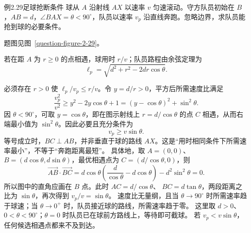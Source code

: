 \begin{origexamplebox}{例2.29\quad 足球抢断条件}
球从 $A$ 沿射线 $AX$ 以速率 $v$ 匀速滚动。守方队员初始在 $B$，$AB=d$，$\angle BAX=\theta<90^\circ$，队员以速率 $v_p$ 沿直线奔跑。忽略边界，求队员能抢到球的必要条件。
\par 题图见图~\ref{question-figure-2-29}。
\KQuestionBD
\end{origexamplebox}
\begin{xesolution}
若在距 $A$ 为 $r\ge0$ 的点相遇，球用时 $r/v$；队员路程由余弦定理为
\[
\ell_p=\sqrt{d^2+r^2-2dr\cos\theta}.
\]
\FootballInterceptionDiagram

必须存在 $r>0$ 使 $\ell_p/v_p\le r/v$。令 $y=d/r>0$，平方后所需速度比满足
\[
\frac{v_p^2}{v^2}\ge y^2-2y\cos\theta+1
=(y-\cos\theta)^2+\sin^2\theta.
\]
因 $\theta<90^\circ$，可取 $y=\cos\theta$，即在图示射线上 $r=d/\cos\theta$ 的点 $C$ 相遇，从而右端最小值为 $\sin^2\theta$。因此必要且充分条件为
\[
  \boxed{v_p\ge v\sin\theta}.
\]
等号成立时，$BC\perp AB$，并非垂直于球的路线 $AX$。这是“用时相同条件下所需速率最小”，不等于“奔跑距离最短”。
具体地，取 $A=(0,0)$、$B=(d\cos\theta,d\sin\theta)$，最优相遇点为 $C=(d/\cos\theta,0)$，则
\[
 \overrightarrow{AB}\cdot\overrightarrow{BC}
 =d\cos\theta\left(\frac d{\cos\theta}-d\cos\theta\right)
   -d^2\sin^2\theta=0.
\]
所以图中的直角应画在 $B$ 点。此时 $AC=d/\cos\theta$、
$BC=d\tan\theta$，两段距离之比为 $\sin\theta$，再次得到 $v_p/v=\sin\theta$。
速度比无量纲，且当 $\theta\to90^\circ$ 时所需速率趋于球速；当 $\theta\to0^+$ 时，队员接近球的路线，所需速率趋于零。
这里取 $d>0$、$0<\theta<90^\circ$；$\theta=0$ 时队员已在球前方路线上，等待即可截球。
若 $v_p<v\sin\theta$，任何候选相遇点都来不及到达。
\end{xesolution}


